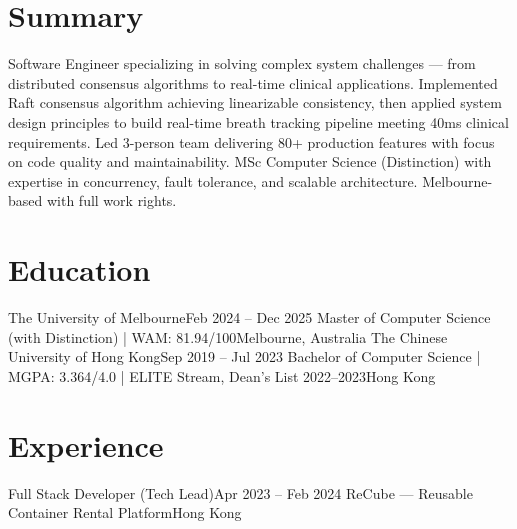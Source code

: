 \documentclass[letterpaper,11pt]{article}
\begin{document}
\makecvheader

\section{Summary}
\small{
Software Engineer specializing in solving complex system challenges — from distributed consensus algorithms to real-time clinical applications. Implemented Raft consensus algorithm achieving linearizable consistency, then applied system design principles to build real-time breath tracking pipeline meeting 40ms clinical requirements. Led 3-person team delivering 80+ production features with focus on code quality and maintainability. MSc Computer Science (Distinction) with expertise in concurrency, fault tolerance, and scalable architecture. Melbourne-based with full work rights.
}

\section{Education}
  \resumeSubHeadingListStart
    \resumeSubheading
      {The University of Melbourne}{Feb 2024 -- Dec 2025}
      {Master of Computer Science (with Distinction) | WAM: 81.94/100}{Melbourne, Australia}
    \resumeSubheading
      {The Chinese University of Hong Kong}{Sep 2019 -- Jul 2023}
      {Bachelor of Computer Science | MGPA: 3.364/4.0 | ELITE Stream, Dean's List 2022--2023}{Hong Kong}
  \resumeSubHeadingListEnd

\section{Experience}
  \resumeSubHeadingListStart
    \resumeSubheading
      {Full Stack Developer (Tech Lead)}{Apr 2023 -- Feb 2024}
      {ReCube — Reusable Container Rental Platform}{Hong Kong}
      \resumeItemListStart
      \resumeItemListEnd
  \resumeSubHeadingListEnd
\end{document}

